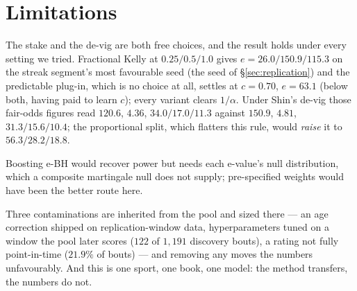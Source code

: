 \documentclass{article}
\begin{document}
\section{Limitations}
\label{sec:limits}

The stake and the de-vig are both free choices, and the result holds under every setting we tried. Fractional Kelly at $0.25/0.5/1.0$ gives $e=26.0/150.9/115.3$ on the streak segment's most favourable seed (the seed of \S\ref{sec:replication}) and the predictable plug-in, which is no choice at all, settles at $c=0.70$, $e=63.1$ (below both, having paid to learn $c$); every variant clears $1/\alpha$. Under Shin's de-vig those fair-odds figures read $120.6$, $4.36$, $34.0/17.0/11.3$ against $150.9$, $4.81$, $31.3/15.6/10.4$; the proportional split, which flatters this rule, would \emph{raise} it to $56.3/28.2/18.8$.

Boosting e-BH \citep{wang2022} would recover power but needs each e-value's null distribution, which a composite martingale null does not supply; pre-specified weights would have been the better route here.

Three contaminations are inherited from the pool and sized there --- an age correction shipped on replication-window data, hyperparameters tuned on a window the pool later scores ($122$ of $1{,}191$ discovery bouts), a rating not fully point-in-time ($21.9\%$ of bouts) --- and removing any moves the numbers unfavourably. And this is one sport, one book, one model: the method transfers, the numbers do not.
\end{document}
